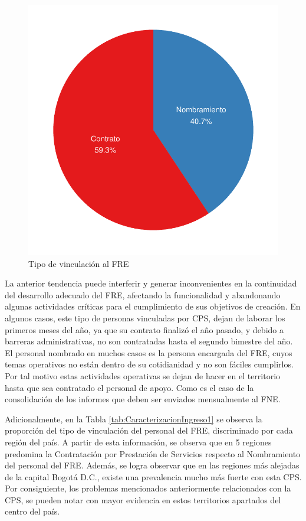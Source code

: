 \documentclass[
]{book}
\begin{document}
\begin{figure}
\includegraphics[width=0.85\linewidth]{InformeFinal_files/figure-latex/pieProfesional2-1} \caption{Tipo de vinculación al FRE}\label{fig:pieProfesional2}
\end{figure}

La anterior tendencia puede interferir y generar inconvenientes en la continuidad del desarrollo adecuado del FRE, afectando la funcionalidad y abandonando algunas actividades críticas para el cumplimiento de sus objetivos de creación. En algunos casos, este tipo de personas vinculadas por CPS, dejan de laborar los primeros meses del año, ya que su contrato finalizó el año pasado, y debido a barreras administrativas, no son contratadas hasta el segundo bimestre del año. El personal nombrado en muchos casos es la persona encargada del FRE, cuyos temas operativos no están dentro de su cotidianidad y no son fáciles cumplirlos. Por tal motivo estas actividades operativas se dejan de hacer en el territorio hasta que sea contratado el personal de apoyo. Como es el caso de la consolidación de los informes que deben ser enviados mensualmente al FNE.

Adicionalmente, en la Tabla \ref{tab:CaracterizacionIngreso1} se observa la proporción del tipo de vinculación del personal del FRE, discriminado por cada región del país. A partir de esta información, se observa que en 5 regiones predomina la Contratación por Prestación de Servicios respecto al Nombramiento del personal del FRE. Además, se logra observar que en las regiones más alejadas de la capital Bogotá D.C., existe una prevalencia mucho más fuerte con esta CPS. Por consiguiente, los problemas mencionados anteriormente relacionados con la CPS, se pueden notar con mayor evidencia en estos territorios apartados del centro del país.
\end{document}
